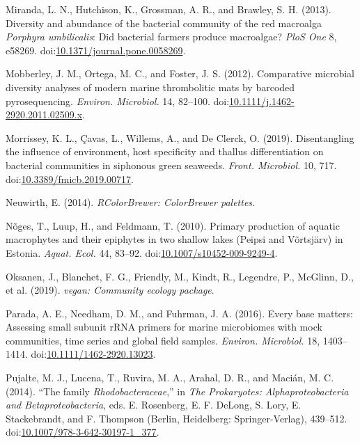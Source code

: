 \documentclass[
  12pt,
]{article}
\begin{document}
\leavevmode\hypertarget{ref-Miranda2013}{}%
Miranda, L. N., Hutchison, K., Grossman, A. R., and Brawley, S. H.
(2013). Diversity and abundance of the bacterial community of the red
macroalga \emph{Porphyra umbilicalis}: Did bacterial farmers produce
macroalgae? \emph{PloS One} 8, e58269.
doi:\href{https://doi.org/10.1371/journal.pone.0058269}{10.1371/journal.pone.0058269}.

\leavevmode\hypertarget{ref-Mobberley2012}{}%
Mobberley, J. M., Ortega, M. C., and Foster, J. S. (2012). Comparative
microbial diversity analyses of modern marine thrombolitic mats by
barcoded pyrosequencing. \emph{Environ. Microbiol.} 14, 82--100.
doi:\href{https://doi.org/10.1111/j.1462-2920.2011.02509.x}{10.1111/j.1462-2920.2011.02509.x}.

\leavevmode\hypertarget{ref-Morrissey2019}{}%
Morrissey, K. L., Çavas, L., Willems, A., and De Clerck, O. (2019).
Disentangling the influence of environment, host specificity and thallus
differentiation on bacterial communities in siphonous green seaweeds.
\emph{Front. Microbiol.} 10, 717.
doi:\href{https://doi.org/10.3389/fmicb.2019.00717}{10.3389/fmicb.2019.00717}.

\leavevmode\hypertarget{ref-Neuwirth2014}{}%
Neuwirth, E. (2014). \emph{RColorBrewer: ColorBrewer palettes}.

\leavevmode\hypertarget{ref-Noges2010}{}%
Nõges, T., Luup, H., and Feldmann, T. (2010). Primary production of
aquatic macrophytes and their epiphytes in two shallow lakes (Peipsi and
Võrtsjärv) in Estonia. \emph{Aquat. Ecol.} 44, 83--92.
doi:\href{https://doi.org/10.1007/s10452-009-9249-4}{10.1007/s10452-009-9249-4}.

\leavevmode\hypertarget{ref-Oksanen2019}{}%
Oksanen, J., Blanchet, F. G., Friendly, M., Kindt, R., Legendre, P.,
McGlinn, D., et al. (2019). \emph{vegan: Community ecology package}.

\leavevmode\hypertarget{ref-Parada2016}{}%
Parada, A. E., Needham, D. M., and Fuhrman, J. A. (2016). Every base
matters: Assessing small subunit rRNA primers for marine microbiomes
with mock communities, time series and global field samples.
\emph{Environ. Microbiol.} 18, 1403--1414.
doi:\href{https://doi.org/10.1111/1462-2920.13023}{10.1111/1462-2920.13023}.

\leavevmode\hypertarget{ref-Pujalte2014}{}%
Pujalte, M. J., Lucena, T., Ruvira, M. A., Arahal, D. R., and Macián, M.
C. (2014). ``The family \emph{Rhodobacteraceae},'' in \emph{The
Prokaryotes: Alphaproteobacteria and Betaproteobacteria}, eds. E.
Rosenberg, E. F. DeLong, S. Lory, E. Stackebrandt, and F. Thompson
(Berlin, Heidelberg: Springer-Verlag), 439--512.
doi:\href{https://doi.org/10.1007/978-3-642-30197-1_377}{10.1007/978-3-642-30197-1\_377}.
\end{document}
